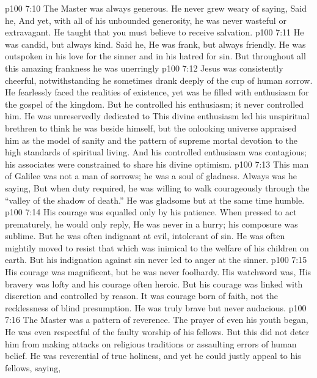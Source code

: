 \vs p100 7:10 The Master was always generous. He never grew weary of saying,  Said he,  And yet, with all of his unbounded generosity, he was never wasteful or extravagant. He taught that you must believe to receive salvation. 
\vs p100 7:11 He was candid, but always kind. Said he,  He was frank, but always friendly. He was outspoken in his love for the sinner and in his hatred for sin. But throughout all this amazing frankness he was unerringly 
\vs p100 7:12 Jesus was consistently cheerful, notwithstanding he sometimes drank deeply of the cup of human sorrow. He fearlessly faced the realities of existence, yet was he filled with enthusiasm for the gospel of the kingdom. But he controlled his enthusiasm; it never controlled him. He was unreservedly dedicated to  This divine enthusiasm led his unspiritual brethren to think he was beside himself, but the onlooking universe appraised him as the model of sanity and the pattern of supreme mortal devotion to the high standards of spiritual living. And his controlled enthusiasm was contagious; his associates were constrained to share his divine optimism.
\vs p100 7:13 This man of Galilee was not a man of sorrows; he was a soul of gladness. Always was he saying,  But when duty required, he was willing to walk courageously through the “valley of the shadow of death.” He was gladsome but at the same time humble.
\vs p100 7:14 His courage was equalled only by his patience. When pressed to act prematurely, he would only reply,  He was never in a hurry; his composure was sublime. But he was often indignant at evil, intolerant of sin. He was often mightily moved to resist that which was inimical to the welfare of his children on earth. But his indignation against sin never led to anger at the sinner.
\vs p100 7:15 His courage was magnificent, but he was never foolhardy. His watchword was,  His bravery was lofty and his courage often heroic. But his courage was linked with discretion and controlled by reason. It was courage born of faith, not the recklessness of blind presumption. He was truly brave but never audacious.
\vs p100 7:16 The Master was a pattern of reverence. The prayer of even his youth began,  He was even respectful of the faulty worship of his fellows. But this did not deter him from making attacks on religious traditions or assaulting errors of human belief. He was reverential of true holiness, and yet he could justly appeal to his fellows, saying, 
